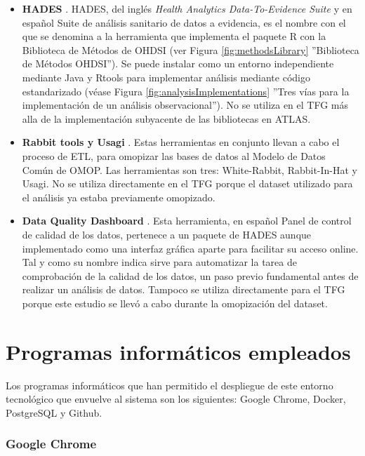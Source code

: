 \begin{itemize}
    
    \item \textbf{HADES} \parencite{githubHADES}. HADES, del inglés\textit{ Health Analytics Data-To-Evidence Suite} y en español Suite de análisis sanitario de datos a evidencia, es el nombre con el que se denomina a la herramienta que implementa el paquete R con la Biblioteca de Métodos de OHDSI (ver Figura \ref{fig:methodsLibrary} ''Biblioteca de Métodos OHDSI''). Se puede instalar como un entorno independiente mediante Java y Rtools para implementar análisis mediante código estandarizado (véase Figura \ref{fig:analysisImplementations} ''Tres vías para la implementación de un análisis observacional''). No se utiliza en el TFG más alla de la implementación subyacente de las bibliotecas en ATLAS.
    \item \textbf{Rabbit tools y Usagi} \parencite{OHDSIsoftTools}. Estas herramientas en conjunto llevan a cabo el proceso de ETL, para omopizar las bases de datos al Modelo de Datos Común de OMOP. Las herramientas son tres: White-Rabbit, Rabbit-In-Hat y Usagi. No se utiliza directamente en el TFG porque el dataset utilizado para el análisis ya estaba previamente omopizado.
    \item \textbf{Data Quality Dashboard} \parencite{githubDQD}. Esta herramienta, en español Panel de control de calidad de los datos, pertenece a un paquete de HADES aunque implementado como una interfaz gráfica aparte para facilitar su acceso online. Tal y como su nombre indica sirve para automatizar la tarea de comprobación de la calidad de los datos, un paso previo fundamental antes de realizar un análisis de datos. Tampoco se utiliza directamente para el TFG porque este estudio se llevó a cabo durante la omopización del dataset.
        
\end{itemize}

\section{Programas informáticos empleados} \label{sec:07programas}

Los programas informáticos que han permitido el despliegue de este entorno tecnológico que envuelve al sistema son los siguientes:  Google Chrome, Docker, PostgreSQL y Github.


\subsubsection{Google Chrome}

